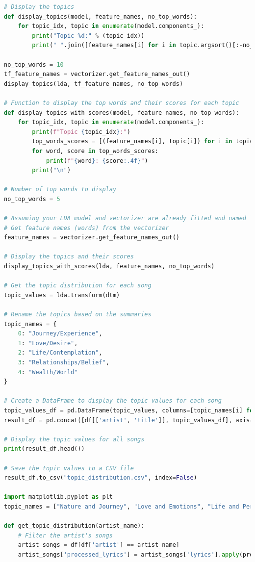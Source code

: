 \documentclass{article}
\begin{document}
\begin{lstlisting}[language=Python]
# Display the topics
def display_topics(model, feature_names, no_top_words):
    for topic_idx, topic in enumerate(model.components_):
        print("Topic %d:" % (topic_idx))
        print(" ".join([feature_names[i] for i in topic.argsort()[:-no_top_words - 1:-1]]))

no_top_words = 10
tf_feature_names = vectorizer.get_feature_names_out()
display_topics(lda, tf_feature_names, no_top_words)

# Function to display the top words and their scores for each topic
def display_topics_with_scores(model, feature_names, no_top_words):
    for topic_idx, topic in enumerate(model.components_):
        print(f"Topic {topic_idx}:")
        top_words_scores = [(feature_names[i], topic[i]) for i in topic.argsort()[:-no_top_words - 1:-1]]
        for word, score in top_words_scores:
            print(f"{word}: {score:.4f}")
        print("\n")

# Number of top words to display
no_top_words = 5

# Assuming your LDA model and vectorizer are already fitted and named `lda` and `vectorizer`, respectively
# Get feature names (words) from the vectorizer
feature_names = vectorizer.get_feature_names_out()

# Display the topics and their scores
display_topics_with_scores(lda, feature_names, no_top_words)

# Get the topic distribution for each song
topic_values = lda.transform(dtm)

# Rename the topics based on the summaries
topic_names = {
    0: "Journey/Experience",
    1: "Love/Desire",
    2: "Life/Contemplation",
    3: "Relationships/Belief",
    4: "Wealth/World"
}

# Create a DataFrame to display the topic values for each song
topic_values_df = pd.DataFrame(topic_values, columns=[topic_names[i] for i in range(lda.n_components)])
result_df = pd.concat([df[['artist', 'title']], topic_values_df], axis=1)

# Display the topic values for all songs
print(result_df.head())

# Save the topic values to a CSV file
result_df.to_csv("topic_distribution.csv", index=False)

import matplotlib.pyplot as plt
topic_names = ["Nature and Journey", "Love and Emotions", "Life and Perceptions", "Youth and Adolescence", "World and Ambition"]

def get_topic_distribution(artist_name):
    # Filter the artist's songs
    artist_songs = df[df['artist'] == artist_name]
    artist_songs['processed_lyrics'] = artist_songs['lyrics'].apply(preprocess_lyrics)
    

\end{lstlisting}
\end{document}
